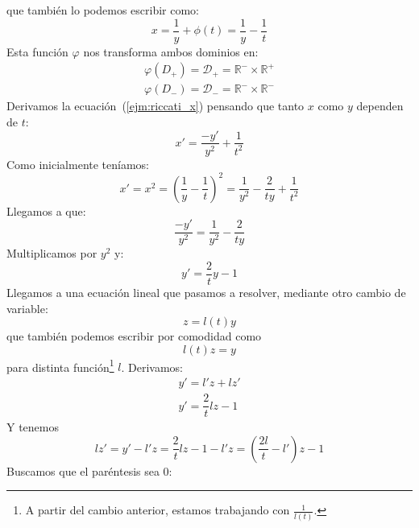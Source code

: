 \begin{ejemplo}
    que también lo podemos escribir como:
    \begin{equation}\label{ejm:riccati_x}
        x = \dfrac{1}{y}+\phi(t) = \dfrac{1}{y}-\dfrac{1}{t}
    \end{equation}
    Esta función $\varphi$ nos transforma ambos dominios en:
    \begin{gather*}
        \varphi(D_+) = \mathcal{D}_+ = \mathbb{R}^- \times \mathbb{R}^+\\
        \varphi(D_-) = \mathcal{D}_- = \mathbb{R}^- \times \mathbb{R}^-
    \end{gather*}
    Derivamos la ecuación~(\ref{ejm:riccati_x}) pensando que tanto $x$ como $y$ dependen de $t$:
    \begin{equation*}
        x' = \dfrac{-y'}{y^2} + \dfrac{1}{t^2}
    \end{equation*}
    Como inicialmente teníamos:
    \begin{equation*}
        x' = x^2 = {\left(\dfrac{1}{y}-\dfrac{1}{t}\right)}^{2} = \dfrac{1}{y^2} - \dfrac{2}{ty} + \dfrac{1}{t^2}
    \end{equation*}
    Llegamos a que:
    \begin{equation*}
        \dfrac{-y'}{y^2} = \dfrac{1}{y^2} - \dfrac{2}{ty}
    \end{equation*}
    Multiplicamos por $y^2$ y:
    \begin{equation*}
        y' = \dfrac{2}{t}y-1
    \end{equation*}
    Llegamos a una ecuación lineal que pasamos a resolver, mediante otro cambio de variable:
    \begin{equation*}
        z = l(t)y
    \end{equation*}
    que también podemos escribir por comodidad como
    \begin{equation*}
        l(t) z = y
    \end{equation*}
    para distinta función\footnote{A partir del cambio anterior, estamos trabajando con $\frac{1}{l(t)}$.} $l$. Derivamos:
    \begin{gather*}
        y' = l' z + lz' \\
        y' = \dfrac{2}{t}lz - 1
    \end{gather*}
    Y tenemos 
    \begin{equation*}
        lz' = y' - l'z = \dfrac{2}{t}lz - 1 - l'z = \left(\dfrac{2l}{t}-l'\right)z -1
    \end{equation*}
    Buscamos que el paréntesis sea 0:
    \begin{equation*}

\end{equation*}
\end{ejemplo}
